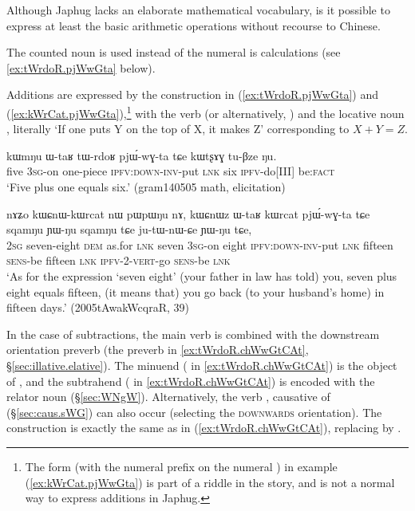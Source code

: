 Although Japhug lacks an elaborate mathematical vocabulary, is it possible to express at least the basic arithmetic operations without recourse to Chinese. 

The counted noun  is used instead of the numeral  is calculations (see \ref{ex:tWrdoR.pjWwGta} below).

Additions are expressed by the construction in (\ref{ex:tWrdoR.pjWwGta}) and (\ref{ex:kWrCat.pjWwGta}),\footnote{The form  (with the numeral prefix  on the numeral ) in example (\ref{ex:kWrCat.pjWwGta}) is part of a riddle in the story, and is not a normal way to express additions in Japhug. } with the verb  (or alternatively, ) and the locative noun , literally  `If one puts Y on the top of X, it makes Z' corresponding to $X+Y=Z$.  

\begin{exe}
\ex \label{ex:tWrdoR.pjWwGta}
\gll kɯmŋu ɯ-taʁ tɯ-rdoʁ pjɯ́-wɣ-ta tɕe kɯtʂɤɣ tu-βze ŋu.  \\
 five \textsc{3sg}-on one-piece \textsc{ipfv}:\textsc{down}-\textsc{inv}-put \textsc{lnk} six \textsc{ipfv}-do[III] be:\textsc{fact} \\
\glt `Five plus one equals six.' (gram140505 math, elicitation)
\end{exe}

 

\begin{exe}
\ex \label{ex:kWrCat.pjWwGta}
\gll  nɤʑo kɯɕnɯ-kɯrcat nɯ pɯpɯŋu nɤ, kɯɕnɯz ɯ-taʁ kɯrcat pjɯ́-wɣ-ta tɕe sqamŋu ɲɯ-ŋu sqamŋu tɕe ju-tɯ-nɯ-ɕe ɲɯ-ŋu tɕe, \\
 \textsc{2sg} seven-eight \textsc{dem} as.for \textsc{lnk} seven  \textsc{3sg}-on eight \textsc{ipfv}:\textsc{down}-\textsc{inv}-put \textsc{lnk}  fifteen   \textsc{sens}-be fifteen \textsc{lnk} \textsc{ipfv}-2-\textsc{vert}-go \textsc{sens}-be \textsc{lnk} \\
\glt `As for the expression `seven eight' (your father in law has told) you, seven plus eight equals fifteen, (it means that) you go back (to your husband's home) in fifteen days.' (2005tAwakWcqraR, 39)
\end{exe}
  
 
In the case of subtractions, the  main verb is   combined with the downstream orientation preverb  (the preverb  in \ref{ex:tWrdoR.chWwGtCAt}, §\ref{sec:illative.elative}).  The minuend ( in \ref{ex:tWrdoR.chWwGtCAt}) is the object of , and the subtrahend  ( in \ref{ex:tWrdoR.chWwGtCAt}) is encoded with the relator noun  (§\ref{sec:WNgW}). Alternatively, the verb , causative of  (§\ref{sec:caus.sWG}) can also occur (selecting the \textsc{downwards} orientation). The construction is exactly the same as in (\ref{ex:tWrdoR.chWwGtCAt}), replacing   by  .


